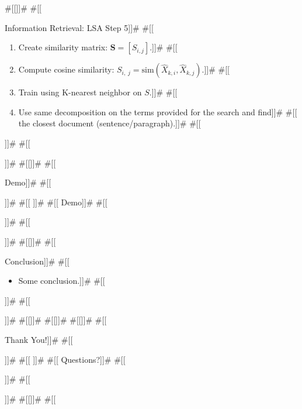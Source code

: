\documentclass[11pt,pdf]{beamer}
\begin{document}
#[[]]#
#[[\begin{frame}{Information Retrieval: LSA Step 5}]]#
#[[  \begin{enumerate}]]#
#[[  \item Create similarity matrix: $\mathbf{S} = [S_{i,j}]$.]]#
#[[  \item Compute cosine similarity: $S_{i,\;j} = \textrm{sim}(\hat{X}_{k,i}, \hat{X}_{k,j})$.]]#
#[[  \item Train using K-nearest neighbor on $S$.]]#
#[[  \item Use same decomposition on the terms provided for the search and find]]#
#[[    the closest document (sentence/paragraph).]]#
#[[  \end{enumerate}]]#
#[[\end{frame}]]#
#[[]]#
#[[\begin{frame}[plain,c]{Demo}]]#
#[[\begin{center}]]#
#[[  \Huge]]#
#[[  Demo]]#
#[[\end{center}]]#
#[[\end{frame}]]#
#[[]]#
#[[\begin{frame}{Conclusion}]]#
#[[  \begin{itemize}]]#
#[[    \item Some conclusion.]]#
#[[  \end{itemize}]]#
#[[\end{frame}]]#
#[[]]#
#[[\zsrefframe]]#
#[[]]#
#[[\begin{frame}[plain,c]{Thank You!}]]#
#[[\begin{center}]]#
#[[  \Huge]]#
#[[  Questions?]]#
#[[\end{center}]]#
#[[\end{frame}]]#
#[[]]#
#[[
\end{document}
